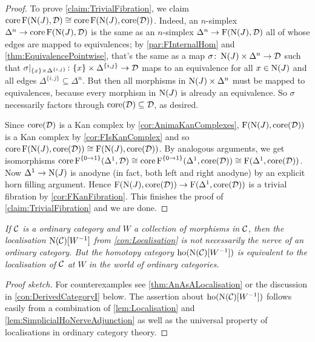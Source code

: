 \begin{proof}
	To prove \cref{claim:TrivialFibration}, we claim $\operatorname{core} \operatorname{F}(\operatorname{N}(J),\mathcal{D})\cong \operatorname{core}\operatorname{F}(\operatorname{N}(J),\operatorname{core}(\mathcal{D}))$. Indeed, an $n$-simplex $\Delta^n\rightarrow\operatorname{core} \operatorname{F}(\operatorname{N}(J),\mathcal{D})$ is the same as an $n$-simplex $\Delta^n\rightarrow \operatorname{F}(\operatorname{N}(J),\mathcal{D})$ all of whose edges are mapped to equivalences; by \cref{par:FInternalHom} and \cref{thm:EquivalencePointwise}, that's the same as a map $\sigma\colon \operatorname{N}(J)\times \Delta^n\rightarrow \mathcal{D}$ such that $\sigma|_{\{x\}\times \Delta^{\{i,j\}}}\colon \{x\}\times \Delta^{\{i,j\}}\rightarrow \mathcal{D}$ maps to an equivalence for all $x\in \operatorname{N}(J)$ and all edges $\Delta^{\{i,j\}}\subseteq \Delta^n$. But then all morphisms in $\operatorname{N}(J)\times \Delta^n$ must be mapped to equivalences, because every morphism in $\operatorname{N}(J)$ is already an equivalence. So $\sigma$ necessarily factors through $\operatorname{core}(\mathcal{D})\subseteq \mathcal{D}$, as desired.
	
	Since $\operatorname{core}(\mathcal{D})$ is a Kan complex by \cref{cor:AnimaKanComplexes}, $\operatorname{F}(\operatorname{N}(J),\operatorname{core}(\mathcal{D}))$ is a Kan complex by \cref{cor:FIsKanComplex} and so $\operatorname{core}\operatorname{F}(\operatorname{N}(J),\operatorname{core}(\mathcal{D}))\cong \operatorname{F}(\operatorname{N}(J),\operatorname{core}(\mathcal{D}))$. By analogous arguments, we get isomorphisms $\operatorname{core}\operatorname{F}^{\{0\rightarrow 1\}}(\Delta^1,\mathcal{D})\cong \operatorname{core}\operatorname{F}^{\{0\rightarrow 1\}}(\Delta^1,\operatorname{core} (\mathcal{D}))\cong \operatorname{F}(\Delta^1,\operatorname{core}(\mathcal{D}))$. Now $\Delta^1\rightarrow \operatorname{N}(J)$ is anodyne (in fact, both left and right anodyne) by an explicit horn filling argument. Hence $\operatorname{F}(\operatorname{N}(J),\operatorname{core}(\mathcal{D}))\rightarrow\operatorname{F}(\Delta^1,\operatorname{core}(\mathcal{D}))$ is a trivial fibration by \cref{cor:FKanFibration}. This finishes the proof of \cref{claim:TrivialFibration} and we are done.
\end{proof}
\begin{numpar}\label{cor:Localisation}\itshape
	If $\mathcal{C}$ is a  ordinary category and $W$ a collection of morphisms in $\mathcal{C}$, then the localisation $\operatorname{N}(\mathcal{C})[W^{-1}]$ from \cref{con:Localisation} is not necessarily the nerve of an ordinary category. But the homotopy category $\operatorname{ho}(\operatorname{N}(\mathcal{C})[W^{-1}])$ is equivalent to the localisation of $\mathcal{C}$ at $W$ in the world of ordinary categories.
\end{numpar}
\begin{proof}[Proof sketch]
	For counterexamples see \cref{thm:AnAsALocalisation} or the discussion in \cref{con:DerivedCategoryI} below. The assertion about $\operatorname{ho}(\operatorname{N}(\mathcal{C})[W^{-1}])$ follows easily from a combination of \cref{lem:Localisation} and \cref{lem:SimplicialHoNerveAdjunction} as well as the universal property of localisations in ordinary category theory.
\end{proof}


